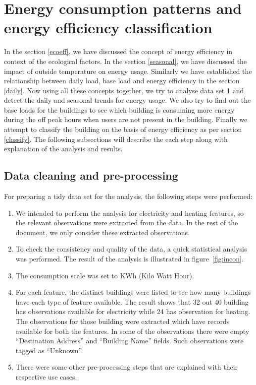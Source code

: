 \section{Energy consumption patterns and energy  efficiency classification}
In the section \ref{ecoeff}, we have discussed the concept of energy efficiency in context of the ecological factors. In the section \ref{seasonal}, we have discussed the impact of outside temperature on energy usage. Similarly we have established the relationship between daily load, base load and energy efficiency in the section \ref{daily}. Now using all these concepts together, we try to analyse data set 1 and detect the daily and seasonal trends for energy usage. We also try to find out the base loads for the buildings to see which building is consuming more energy during the off peak hours when users are not present in the building. Finally we attempt to classify the building on the basis of energy efficiency as per section \ref{classify}. The following subsections will describe the each step along with explanation of the analysis and results.
\subsection{Data cleaning and pre-processing} \label{cleaning}
For preparing a tidy data set for the analysis, the following steps were performed:
\begin{enumerate}
\item We intended to perform the analysis for electricity and heating features, so the relevant observations were extracted from the data. In the rest of the document, we only consider these extracted observations.
\item To check the consistency and quality of the data, a quick statistical analysis was performed. The result of the analysis is illustrated in figure~\ref{fig:incon}.
\item The consumption scale was set to KWh (Kilo Watt Hour).
\item For each feature, the distinct buildings were listed to see how many buildings have each type of feature available. The result shows that 32 out 40 building has observations available for electricity while 24 has observation for heating. The observations for those building were extracted which have records available for both the features. In some of the observations there were empty ``Destination Address'' and ``Building Name'' fields. Such observations were tagged as ``Unknown''. 
\item There were some other pre-processing steps that are explained with their respective use cases.
\end{enumerate}

